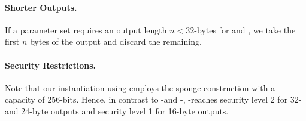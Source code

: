    \paragraph{Shorter Outputs.} If a parameter set requires an 
   output length $n < 32$-bytes for \sphincsF and \sphincsPRF,
   we take the first $n$ bytes of the output and discard the remaining.

   \paragraph{Security Restrictions.} Note that our instantiation using \haraka 
   employs the sponge construction with a capacity of 256-bits. Hence, in 
   contrast to \spx-\shatwo and \spx-\shathree, \spx-\haraka reaches 
   security level 2 for 32- and 24-byte outputs and security level 1 for 
   16-byte outputs.
   
   

